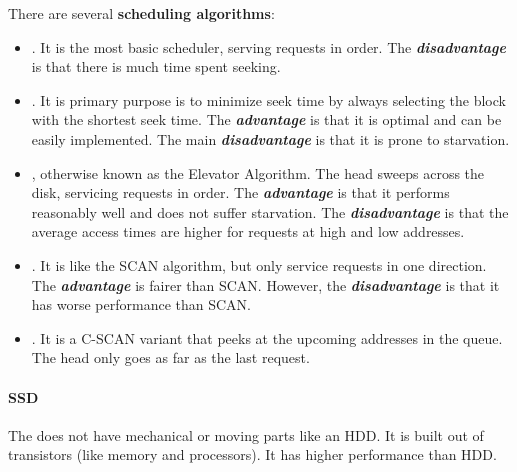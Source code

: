 \noindent
There are several \textbf{scheduling algorithms}:
\begin{itemize}
    \item {}. It is the most basic scheduler, serving requests in order. The \emph{\textbf{disadvantage}} is that there is much time spent seeking.

    \item {}. It is primary purpose is to minimize seek time by always selecting the block with the shortest seek time. The \textbf{\emph{advantage}} is that it is optimal and can be easily implemented. The main \emph{\textbf{disadvantage}} is that it is prone to starvation.

    \item {}, otherwise known as the Elevator Algorithm. The head sweeps across the disk, servicing requests in order. The \textbf{\emph{advantage}} is that it performs reasonably well and does not suffer starvation. The \emph{\textbf{disadvantage}} is that the average access times are higher for requests at high and low addresses.

    \item {}. It is like the SCAN algorithm, but only service requests in one direction. The \textbf{\emph{advantage}} is fairer than SCAN. However, the \emph{\textbf{disadvantage}} is that it has worse performance than SCAN.

    \item {}. It is a C-SCAN variant that peeks at the upcoming addresses in the queue. The head only goes as far as the last request.
\end{itemize}

\newpage

\paragraph{SSD}

The  does not have mechanical or moving parts like an HDD. It is built out of transistors (like memory and processors). It has higher performance than HDD.

